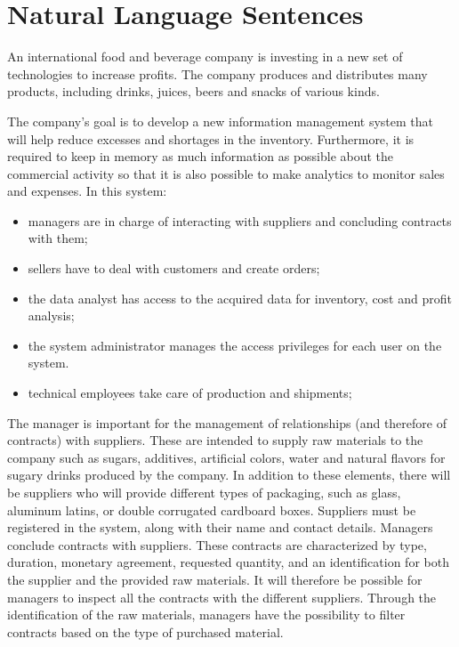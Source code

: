 \section{Natural Language Sentences}

An international food and beverage company is investing in a new set of technologies to increase profits.
The company produces and distributes many products, including drinks, juices, beers and snacks of various kinds.

The company's goal is to develop a new information management system that will help reduce excesses and shortages in the inventory. Furthermore, it is required to keep in memory as much information as possible about the commercial activity so that it is also possible to make analytics to monitor sales and expenses. In this system:
\begin{itemize}
    \item managers are in charge of interacting with suppliers and concluding contracts with them;
    \item sellers have to deal with customers and create orders;
    \item the data analyst has access to the acquired data for inventory, cost and profit analysis;
    \item the system administrator manages the access privileges for each user on the system.
    \item technical employees take care of production and shipments;
\end{itemize}

The manager is important for the management of relationships (and therefore of contracts) with suppliers. These are intended to supply raw materials to the company such as sugars, additives, artificial colors, water and natural flavors for sugary drinks produced by the company. In addition to these elements, there will be suppliers who will provide different types of packaging, such as glass, aluminum latins, or double corrugated cardboard boxes. Suppliers must be registered in the system, along with their name and contact details. Managers conclude contracts with suppliers. These contracts are characterized by type, duration, monetary agreement, requested quantity, and an identification for both the supplier and the provided raw materials. It will therefore be possible for managers to inspect all the contracts with the different suppliers. Through the identification of the raw materials, managers have the possibility to filter contracts based on the type of purchased material.

